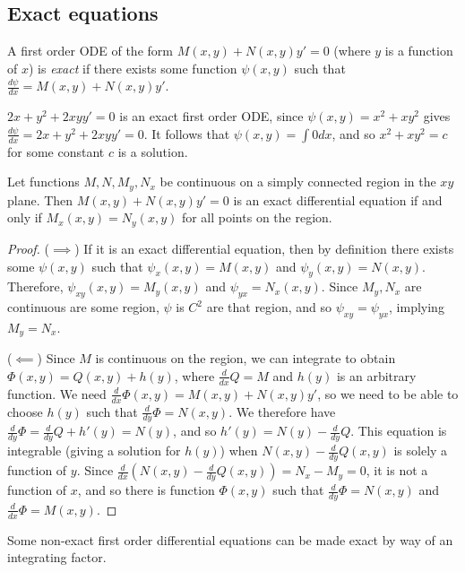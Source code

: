 \documentclass[12pt]{article}
\begin{document}
\subsection{Exact equations}

\begin{defn}
    A first order ODE of the form $M(x, y) + N(x, y)y' = 0$ (where $y$ is a function of $x$) is \emph{exact} if there exists some function $\psi(x, y)$ such that $\frac{d\psi}{dx} = M(x, y) + N(x, y)y'$.
\end{defn}

\begin{exmp}
    $2x + y^2 + 2xyy' = 0$ is an exact first order ODE, since $\psi(x, y) = x^2 + xy^2$ gives $\frac{d\psi}{dx} = 2x + y^2 + 2xyy' = 0$. It follows that $\psi(x, y) = \int{0}dx$, and so $x^2 + xy^2 = c$ for some constant $c$ is a solution.
\end{exmp}

\begin{thm}
    Let functions $M, N, M_y, N_x$ be continuous on a simply connected region in the $xy$ plane. Then $M(x, y) + N(x, y)y' = 0$ is an exact differential equation if and only if $M_x(x, y) = N_y(x, y)$ for all points on the region.
\end{thm}

\begin{proof}\proofbreak
    ($\implies$) If it is an exact differential equation, then by definition there exists some $\psi(x, y)$ such that $\psi_x(x, y) = M(x, y)$ and $\psi_y(x, y) = N(x, y)$. Therefore, $\psi_{xy}(x, y) = M_y(x, y)$ and $\psi_{yx} = N_x(x, y)$. Since $M_y, N_x$ are continuous are some region, $\psi$ is $C^2$ are that region, and so $\psi_{xy} = \psi_{yx}$, implying $M_y = N_x$.

    ($\impliedby$) Since $M$ is continuous on the region, we can integrate to obtain $\varPhi(x, y) = Q(x, y) + h(y)$, where $\frac{d}{dx}Q = M$ and $h(y)$ is an arbitrary function. We need $\frac{d}{dx}\varPhi(x, y) = M(x, y) + N(x, y)y'$, so we need to be able to choose $h(y)$ such that $\frac{d}{dy}\varPhi = N(x,y)$. We therefore have $\frac{d}{dy}\varPhi = \frac{d}{dy}Q + h'(y) = N(y)$, and so $h'(y) = N(y) - \frac{d}{dy}Q$. This equation is integrable (giving a solution for $h(y)$) when $N(x,y) - \frac{d}{dy}Q(x,y)$ is solely a function of $y$. Since $\frac{d}{dx}\left(N(x,y) - \frac{d}{dy}Q(x,y)\right) = N_x - M_y = 0$, it is not a function of $x$, and so there is function $\varPhi(x,y)$ such that $\frac{d}{dy}\varPhi = N(x,y)$ and $\frac{d}{dx}\varPhi = M(x,y)$.
\end{proof}

\begin{rmk}
    Some non-exact first order differential equations can be made exact by way of an integrating factor.
\end{rmk}
\end{document}
